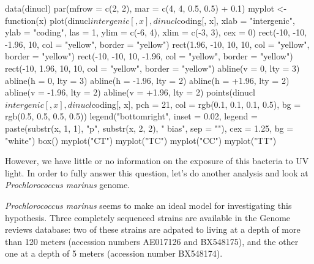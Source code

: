 \documentclass{article}
\begin{document}
\begin{Schunk}
\begin{Sinput}
 data(dinucl)
 par(mfrow = c(2, 2), mar = c(4, 4, 0.5, 0.5) + 0.1)
 myplot <- function(x) {
     plot(dinucl$intergenic[, x], dinucl$coding[, x], xlab = "intergenic", 
         ylab = "coding", las = 1, ylim = c(-6, 4), xlim = c(-3, 
             3), cex = 0)
     rect(-10, -10, -1.96, 10, col = "yellow", border = "yellow")
     rect(1.96, -10, 10, 10, col = "yellow", border = "yellow")
     rect(-10, -10, 10, -1.96, col = "yellow", border = "yellow")
     rect(-10, 1.96, 10, 10, col = "yellow", border = "yellow")
     abline(v = 0, lty = 3)
     abline(h = 0, lty = 3)
     abline(h = -1.96, lty = 2)
     abline(h = +1.96, lty = 2)
     abline(v = -1.96, lty = 2)
     abline(v = +1.96, lty = 2)
     points(dinucl$intergenic[, x], dinucl$coding[, x], pch = 21, 
         col = rgb(0.1, 0.1, 0.1, 0.5), bg = rgb(0.5, 0.5, 
             0.5, 0.5))
     legend("bottomright", inset = 0.02, legend = paste(substr(x, 
         1, 1), "p", substr(x, 2, 2), " bias", sep = ""), cex = 1.25, 
         bg = "white")
     box()
 }
 myplot("CT")
 myplot("TC")
 myplot("CC")
 myplot("TT")
\end{Sinput}
\end{Schunk}

\begin{figure}
\centering{}\end{figure}

However, we have little or no information on the exposure of this
bacteria to UV light. In order to fully answer this question, let's do
another analysis and look at \textit{Prochlorococcus marinus} genome.

\textit{Prochlorococcus marinus} seems to make an ideal model for
investigating this hypothesis. Three completely sequenced strains are
available in the Genome reviews database: two of these strains are
adpated to living at a depth of more than 120 meters (accession
numbers AE017126 and BX548175), and the other one at a depth of 5
meters (accession number BX548174).
\end{document}
